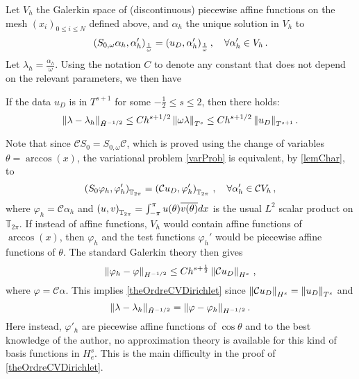 \documentclass[a4paper]{article}
\begin{document}
 Let $V_h$ the Galerkin space of (discontinuous) piecewise affine functions 
 on the mesh $(x_i)_{0\leq i \leq N}$ defined above, and $\alpha_h$ the unique solution in $V_h$ to
 \begin{equation}
 \label{varProb}
 \left( S_{0,\omega} \alpha_h,\alpha_h'\right)_\frac{1}{\omega} = \left( u_D,\alpha_h'\right)_\frac{1}{\omega}, \quad \forall \alpha_h' \in V_h\,.
 \end{equation}
 Let $\lambda_h = \frac{\alpha_h}{\omega}$. Using the notation $C$ to denote any constant that does not depend on the relevant parameters, we then have
 \begin{theorem}
 	If the data $u_D$ is in $T^{s+1}$ for some $-\frac{1}{2} \leq s \leq 2$, then there holds:
 	\[ \left\|\lambda - \lambda_h\right\|_{\tilde{H}^{-1/2}} \leq C h^{s+1/2} \left\|\omega \lambda\right\|_{T^{s}}\leq C h^{s+1/2} \left\|u_D\right\|_{T^{s+1}}.\]
 	\label{theOrdreCVDirichlet}
 \end{theorem}
 Note that since $\mathcal{C} S_0 = S_{0,\omega} \mathcal{C}$, which is proved using the change of variables $\theta = \arccos(x)$, the variational problem \eqref{varProb} is equivalent, by \autoref{lemChar}, to 
 \begin{equation*}
 	\left( S_{0}\varphi_h,\varphi_h'\right)_{\mathbb{T}_{2\pi}} = \left( \mathcal{C}u_D,\varphi_h'\right)_{\mathbb{T}_{2\pi}}\,, \quad  \forall \alpha_h' \in \mathcal{C}V_h\,,
 \end{equation*}
where $\varphi_h = \mathcal{C}\alpha_h$ and $\left( u,v\right)_{\mathbb{T}_{2\pi}} = \int_{-\pi}^{\pi} u(\theta) \overline{v(\theta)}dx$ is the usual $L^2$ scalar product on $\mathbb{T}_{2\pi}$. If instead of affine functions, $V_h$ would contain affine functions of $\arccos(x)$, then $\varphi_h$ and the test functions $\varphi_h'$ would be piecewise affine functions of $\theta$. The standard Galerkin theory then gives
\[\left\|\varphi_h - \varphi\right\|_{H^{-1/2}} \leq Ch^{s + \frac{1}{2}}\left\|\mathcal{C}u_D\right\|_{H^s}\,,\]
where $\varphi = \mathcal{C}\alpha$.   
This implies \autoref{theOrdreCVDirichlet} since
$\left\|\mathcal{C}u_D\right\|_{H^s} = \left\|u_D\right\|_{T^s}$ and \[{\left\|\lambda - \lambda_h\right\|_{\tilde{H}^{-1/2}} = \left\|\varphi - \varphi_h\right\|_{H^{-1/2}}}\,.\] 
Here instead, $\varphi'_h$ are piecewise affine functions of $\cos\theta$ and to the best knowledge of the author, no approximation theory is available for this kind of basis functions in $H^s_e$. This is the main difficulty in the proof of \autoref{theOrdreCVDirichlet}. 
\end{document}
